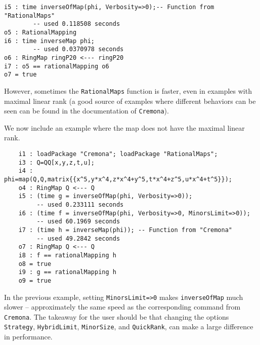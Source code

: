 \documentclass[11pt]{amsart}%
\numberwithin{equation}{theorem}
\renewcommand{\:}{\colon}
\theoremstyle{theorem}
\begin{document}
{{{\begin{verbatim}
i5 : time inverseOfMap(phi, Verbosity=>0);-- Function from "RationalMaps"                              
        -- used 0.118508 seconds                                                                             
o5 : RationalMapping
i6 : time inverseMap phi;
        -- used 0.0370978 seconds                                                                            
o6 : RingMap ringP20 <--- ringP20                                                                         
i7 : o5 == rationalMapping o6    
o7 = true
\end{verbatim}
}
{\color{black}\normalsize}
However, sometimes the {\tt RationalMaps} function is faster, even in examples with maximal linear rank (a good source of examples where different behaviors can be seen can be found in the documentation of {\tt Cremona}). %
}
{\color{black}\normalsize
We now include an example where the map does not have the maximal linear rank.  %
}
{\scriptsize
\color{blue}\begin{verbatim}
    i1 : loadPackage "Cremona"; loadPackage "RationalMaps";
    i3 : Q=QQ[x,y,z,t,u];    
    i4 : phi=map(Q,Q,matrix{{x^5,y*x^4,z*x^4+y^5,t*x^4+z^5,u*x^4+t^5}});    
    o4 : RingMap Q <--- Q                                                                                     
    i5 : (time g = inverseOfMap(phi, Verbosity=>0));
         -- used 0.233111 seconds                                                                             
    i6 : (time f = inverseOfMap(phi, Verbosity=>0, MinorsLimit=>0));
         -- used 60.1969 seconds                                                                          
    i7 : (time h = inverseMap(phi)); -- Function from "Cremona"                                           
         -- used 49.2842 seconds                                                                              
    o7 : RingMap Q <--- Q                                                                                     
    i8 : f == rationalMapping h
    o8 = true
    i9 : g == rationalMapping h
    o9 = true
\end{verbatim}
}
{\color{black}\normalsize
In the previous example, setting {\tt MinorsLimit=>0} makes {\tt inverseOfMap} much slower -- approximately the same speed as the  corresponding command from {\tt Cremona}.
The takeaway for the user should be that changing the options {\tt Strategy}, {\tt HybridLimit}, {\tt MinorSize}, and {\tt QuickRank}, can make a large difference in performance.

}}
\end{document}
